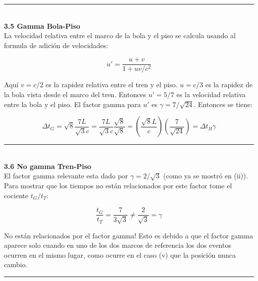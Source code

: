 \documentclass[12pt]{article}
\begin{document}
\noindent\rule{16.5cm}{0.4pt}\\
\textbf{3.5 Gamma Bola-Piso}\\

La velocidad relativa entre el marco de la bola y el piso se calcula usando al formula de adición de velocidades:

\begin{equation}
u'= \frac{u+v}{1+ uv/c^2}
\end{equation}

Aquí  $v = c/2$ es la rapidez relativa entre el tren y el piso. $u = c/3$ es la rapidez de la bola vista desde el marco del
tren. Entonces $u' = 5/7$ es la velocidad relativa entre la bola y el piso. El factor gamma para $u'$ es $\gamma = 7/\sqrt{24}$. Entonces se tiene:


\begin{equation}
\Delta t_G = \sqrt{8} \frac{7L}{\sqrt{3}c} = \frac{7L}{\sqrt{3}c} \frac{\sqrt{8}}{\sqrt{8}} = \left(\frac{\sqrt{8}L}{c}\right) \left( \frac{7}{\sqrt{24}}\right) = \Delta t_B \gamma
\end{equation}
\noindent\rule{16.5cm}{0.4pt}\\
\textbf{3.6 No gamma Tren-Piso}\\

El factor gamma relevante esta dado por $\gamma = 2/ \sqrt{3}$ (como ya se mostró en (ii)). Para mostrar que los tiempos
no están relacionados por este factor tome el cociente $t_G /t_T$:

\begin{equation}
\frac{t_G}{t_T} = \frac{7}{3\sqrt{3}}\neq  \frac{2}{\sqrt{3}} = \gamma
\end{equation}

No están relacionados por el factor gamma! Esto es debido a que el factor gamma aparece solo cuando en uno de
los dos marcos de referencia los dos eventos ocurren en el mismo lugar, como ocurre en el caso (v) que la posición
nunca cambio.


\color{ForestGreen}


\noindent\rule{16.5cm}{0.4pt}
\end{document}

